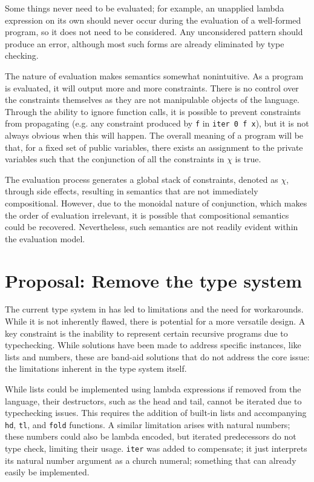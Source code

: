 \documentclass[
    9pt,            
    techreport,       
    affiltop,       
]{art}
\begin{document}
Some things never need to be evaluated; for example, an unapplied lambda expression on its own should never occur during the evaluation of a well-formed program, so it does not need to be considered. Any unconsidered pattern should produce an error, although most such forms are already eliminated by type checking.

The nature of evaluation makes semantics somewhat nonintuitive. As a program is evaluated, it will output more and more constraints. There is no control over the constraints themselves as they are not manipulable objects of the language. Through the ability to ignore function calls, it is possible to prevent constraints from propagating (e.g. any constraint produced by \texttt{f} in \texttt{iter 0 f x}), but it is not always obvious when this will happen. The overall meaning of a program will be that, for a fixed set of public variables, there exists an assignment to the private variables such that the conjunction of all the constraints in $\chi$ is true. 

\begin{remark}\label{remark:semanatics-no-compositional}
The evaluation process generates a global stack of constraints, denoted as $\chi$, through side effects, resulting in semantics that are not immediately compositional. However, due to the monoidal nature of conjunction, which makes the order of evaluation irrelevant, it is possible that compositional semantics could be recovered. Nevertheless, such semantics are not readily evident within the evaluation model.
\end{remark}

\section{Proposal: Remove the type system}
\label{sec:removal-type-system}

The current type system in \VampIR{} has led to limitations and the need for workarounds. While it is not inherently flawed, there is potential for a more versatile design. A key constraint is the inability to represent certain recursive programs due to typechecking. While solutions have been made to address specific instances, like lists and numbers, these are band-aid solutions that do not address the core issue: the limitations inherent in the type system itself. 

While lists could be implemented using lambda expressions if removed from the language, their destructors, such as the head and tail, cannot be iterated due to typechecking issues. This requires the addition of built-in lists and accompanying \texttt{hd}, \texttt{tl}, and \texttt{fold} functions. A similar limitation arises with natural numbers; these numbers could also be lambda encoded, but iterated predecessors do not type check, limiting their usage. \texttt{iter} was added to compensate; it just interprets its natural number argument as a church numeral; something that can already easily be implemented. 
\end{document}
